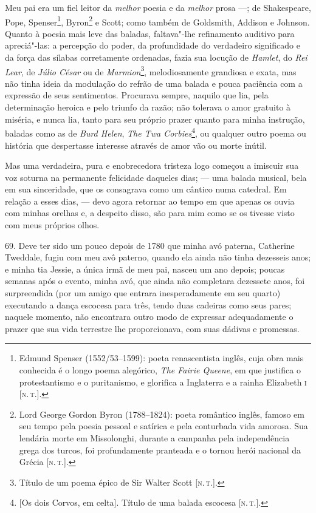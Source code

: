 Meu pai era um fiel leitor da \emph{melhor} poesia e da \emph{melhor}
prosa ---; de Shakespeare, Pope, Spenser\footnote{Edmund Spenser (1552/53--1599): poeta renascentista inglês, cuja obra mais conhecida é o
  longo poema alegórico, \emph{The Fairie Queene}, em que justifica o
  protestantismo e o puritanismo, e glorifica a Inglaterra e a rainha
  Elizabeth \textsc{i} {[}\textsc{n.\,t.}{]}.}, Byron\footnote{Lord George Gordon Byron
  (1788--1824): poeta romântico inglês, famoso em seu tempo pela
  poesia pessoal e satírica e pela conturbada vida amorosa. Sua lendária
  morte em Missolonghi, durante a campanha pela independência grega dos
  turcos, foi profundamente pranteada e o tornou herói nacional da
  Grécia {[}\textsc{n.\,t.}{]}.} e Scott; como também de Goldsmith, Addison e
Johnson. Quanto à poesia mais leve das baladas, faltava"-lhe refinamento
auditivo para apreciá"-las: a percepção do poder, da profundidade do
verdadeiro significado e da força das sílabas corretamente ordenadas,
fazia sua locução de \emph{Hamlet}, do \emph{Rei Lear}, de \emph{Júlio
César} ou de \emph{Marmion}\footnote{Título de um poema épico de Sir
  Walter Scott {[}\textsc{n.\,t.}{]}.}, melodiosamente grandiosa e exata, mas
não tinha ideia da modulação do refrão de uma balada e pouca paciência
com a expressão de seus sentimentos. Procurava sempre, naquilo que lia,
pela determinação heroica e pelo triunfo da razão; não tolerava o amor
gratuito à miséria, e nunca lia, tanto para seu próprio prazer quanto
para minha instrução, baladas como as de \emph{Burd Helen}, \emph{The
Twa Corbies}\footnote{{[}Os dois Corvos, em celta{]}. Título de uma
  balada escocesa {[}\textsc{n.\,t.}{]}.}, ou qualquer outro poema ou história
que despertasse interesse através de amor vão ou morte inútil.

Mas uma verdadeira, pura e enobrecedora tristeza logo começou a imiscuir
sua voz soturna na permanente felicidade daqueles dias; --- uma balada
musical, bela em sua sinceridade, que os consagrava como um cântico numa
catedral. Em relação a esses dias, --- devo agora retornar ao tempo em
que apenas os ouvia com minhas orelhas e, a despeito disso, são para mim
como se os tivesse visto com meus próprios olhos.

69. Deve ter sido um pouco depois de 1780 que minha avó paterna,
Catherine Tweddale, fugiu com meu avô paterno, quando ela ainda não
tinha dezesseis anos; e minha tia Jessie, a única irmã de meu pai,
nasceu um ano depois; poucas semanas após o evento, minha avó, que ainda
não completara dezessete anos, foi surpreendida (por um amigo que
entrara inesperadamente em seu quarto) executando a dança escocesa para
três, tendo duas cadeiras como seus pares; naquele momento, não
encontrara outro modo de expressar adequadamente o prazer que sua vida
terrestre lhe proporcionava, com suas dádivas e promessas.

